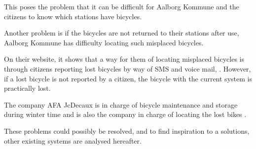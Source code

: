 This poses the problem that it can be difficult for Aalborg Kommune and the citizens to know which stations have bicycles.

Another problem is if the bicycles are not returned to their stations after use, Aalborg Kommune has difficulty locating such misplaced bicycles.

On their website, it shows that a way for them of locating misplaced bicycles is through citizens reporting lost bicycles by way of SMS and voice mail, \citep{misc:aalborgbycykelmangler}.
However, if a lost bicycle is not reported by a citizen, the bicycle with the current system is practically lost.

The company AFA JcDecaux is in charge of bicycle maintenance and storage during winter time and is also the company in charge of locating the lost bikes \citep{misc:aalborgcykling}.


These problems could possibly be resolved, and to find inspiration to a solutions, other existing systems are analysed hereafter.